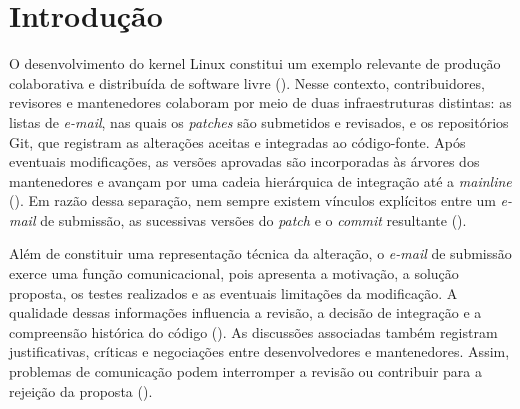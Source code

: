 

\chapter{Introdução}
\label{cap:introducao}

O desenvolvimento do kernel Linux constitui um exemplo relevante de produção colaborativa e distribuída de software livre (\cite{ferreira2019maintainers}). Nesse contexto, contribuidores, revisores e mantenedores colaboram por meio de duas infraestruturas distintas: as listas de \textit{e-mail}, nas quais os \textit{patches} são submetidos e revisados, e os repositórios Git, que registram as alterações aceitas e integradas ao código-fonte. Após eventuais modificações, as versões aprovadas são incorporadas às árvores dos mantenedores e avançam por uma cadeia hierárquica de integração até a \textit{mainline} (\cite{ferreira2019maintainers, ramsauer2019list}). Em razão dessa separação, nem sempre existem vínculos explícitos entre um \textit{e-mail} de submissão, as sucessivas versões do \textit{patch} e o \textit{commit} resultante (\cite{jiang2014tracing}).

Além de constituir uma representação técnica da alteração, o \textit{e-mail} de submissão exerce uma função comunicacional, pois apresenta a motivação, a solução proposta, os testes realizados e as eventuais limitações da modificação. A qualidade dessas informações influencia a revisão, a decisão de integração e a compreensão histórica do código (\cite{tan2019communicate}). As discussões associadas também registram justificativas, críticas e negociações entre desenvolvedores e mantenedores. Assim, problemas de comunicação podem interromper a revisão ou contribuir para a rejeição da proposta (\cite{ferreira2021incivility}).

